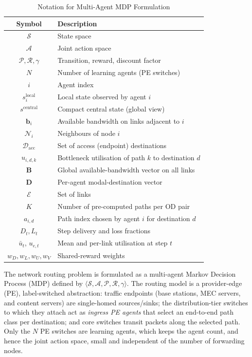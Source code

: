 \documentclass[10pt,journal,comsoc]{IEEEtran}
\begin{document}
\begin{table}[!t]
  \centering
  \caption{Notation for Multi-Agent MDP Formulation}
  \label{tab:mamdp_notation}
  \begin{tabular}{cl}
    \toprule
    \textbf{Symbol} & \textbf{Description} \\
    \midrule
    $\mathcal{S}$ & State space \\
    $\mathcal{A}$ & Joint action space \\
    $\mathcal{P},\mathcal{R},\gamma$ & Transition, reward, discount factor \\
    $N$ & Number of learning agents (PE switches) \\
    $i$ & Agent index \\
    \midrule
    $s_i^{\text{local}}$ & Local state observed by agent $i$ \\
    $s^{\text{central}}$ & Compact central state (global view) \\
    $\mathbf{b}_i$ & Available bandwidth on links adjacent to $i$ \\
    $\mathcal{N}_i$ & Neighbours of node $i$ \\
    $\mathcal{D}_{\text{acc}}$ & Set of access (endpoint) destinations \\
    $u_{i,d,k}$ & Bottleneck utilisation of path $k$ to destination $d$ \\
    $\mathbf{B}$ & Global available-bandwidth vector on all links \\
    $\mathbf{D}$ & Per-agent modal-destination vector \\
    $\mathcal{E}$ & Set of links \\
    $K$ & Number of pre-computed paths per OD pair \\
    $a_{i,d}$ & Path index chosen by agent $i$ for destination $d$ \\
    \midrule
    $D_t, L_t$ & Step delivery and loss fractions \\
    $\bar{u}_t$, $u_{e,t}$ & Mean and per-link utilisation at step $t$ \\
    $w_D,w_L,w_U,w_V$ & Shared-reward weights \\
    \bottomrule
  \end{tabular}
\end{table}

The network routing problem is formulated as a multi-agent Markov Decision Process (MDP) defined by $\langle \mathcal{S}, \mathcal{A}, \mathcal{P}, \mathcal{R}, \gamma \rangle$. The routing model is a provider-edge (PE), label-switched abstraction: traffic endpoints (base stations, MEC servers, and content servers) are single-homed sources/sinks; the distribution-tier switches to which they attach act as \emph{ingress PE agents} that select an end-to-end path class per destination; and core switches transit packets along the selected path. Only the $N$ PE switches are learning agents, which keeps the agent count, and hence the joint action space, small and independent of the number of forwarding nodes.
\end{document}
